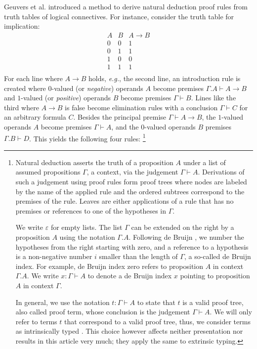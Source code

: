 \documentclass[a4paper,USenglish,cleveref, autoref, thm-restate]{lipics-v2019}
\newcommand{\eg}{\emph{e.g.}\xspace}
\newcommand{\Ge}{\ensuremath{\varepsilon}}
\begin{document}
Geuvers et al. \cite{geuversHurkens:icla17} introduced a method to derive natural
deduction proof rules from truth tables of logical connectives.
For instance, consider the truth table for implication:
\[
\begin{array}{cc|c}
  A & B & A \to B \\
\hline
  0 & 0 & 1 \\
  0 & 1 & 1 \\
  1 & 0 & 0 \\
  1 & 1 & 1 \\
\end{array}
\]
For each line where $A \to B$ holds, \eg, the second line, an
introduction rule is created where $0$-valued (or \emph{negative})
operands $A$ become premises $\Gamma.A \vdash A \to B$ and $1$-valued
(or \emph{positive}) operands $B$ become premises $\Gamma \vdash B$.
Lines like the third where $A \to B$ is false become elimination rules
with a conclusion $\Gamma \vdash C$ for an arbitrary formula $C$.
Besides the principal premise $\Gamma \vdash A \to B$, the $1$-valued
operands $A$ become premises $\Gamma \vdash A$, and the $0$-valued
operands $B$ premises $\Gamma.B \vdash D$.  This yields the following
four rules:%
%
\footnote{%
Natural deduction asserts the truth of a proposition $A$
  under a list of assumed propositions $\Gamma$, a context, via the
  judgement $\Gamma \vdash A$.  Derivations of such a judgement using
  proof rules form proof trees where nodes are labeled by the name of
  the applied rule and the ordered subtrees correspond to the premises
  of the rule.  Leaves are either applications of a rule that has no
  premises or references to one of the hypotheses in $\Gamma$.
\par
  We write $\Ge$ for empty lists.
  The list $\Gamma$ can be extended on the right by a proposition $A$
  using the notation $\Gamma.A$.  Following de Bruijn
  \cite{deBruijn:nameless}, we number the hypotheses from the right
  starting with zero, and a reference to a hypothesis is a
  non-negative number $i$ smaller than the length of $\Gamma$, a
  so-called de Bruijn index.  For example, de Bruijn index zero
  refers to proposition $A$ in context $\Gamma.A$.  We write $x :
  \Gamma \vdash A$ to denote a de Bruijn index $x$ pointing to
  proposition $A$ in context $\Gamma$.
\par
  In general, we use the notation $t : \Gamma \vdash A$ to state that
  $t$ is a valid proof tree, also called proof term, whose conclusion
  is the judgement $\Gamma \vdash A$.  We will only refer to terms $t$
  that correspond to a valid proof tree, thus, we consider terms as
  intrinsically typed
  \cite{alti:monadic,bentonHurKennedyMcBride:jar12}.  This choice
  however affects neither presentation nor results in this article
  very much; they apply the same to extrinsic typing.
%
}%
\end{document}
